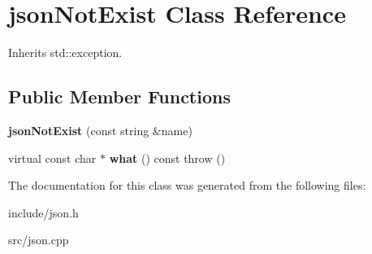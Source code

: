 \hypertarget{classjsonNotExist}{\section{json\-Not\-Exist \-Class \-Reference}
\label{classjsonNotExist}
}


\-Inherits std\-::exception.

\subsection*{\-Public \-Member \-Functions}
\begin{DoxyCompactItemize}
\item 
\hypertarget{classjsonNotExist_a773ce08b974274df7c92bba5c21dc3aa}{{\bfseries json\-Not\-Exist} (const string \&name)}\label{classjsonNotExist_a773ce08b974274df7c92bba5c21dc3aa}

\item 
\hypertarget{classjsonNotExist_a42dfc1325d3f1c2a02223a6ebf193274}{virtual const char $\ast$ {\bfseries what} () const   throw ()}\label{classjsonNotExist_a42dfc1325d3f1c2a02223a6ebf193274}

\end{DoxyCompactItemize}


\-The documentation for this class was generated from the following files\-:\begin{DoxyCompactItemize}
\item 
include/json.\-h\item 
src/json.\-cpp\end{DoxyCompactItemize}
